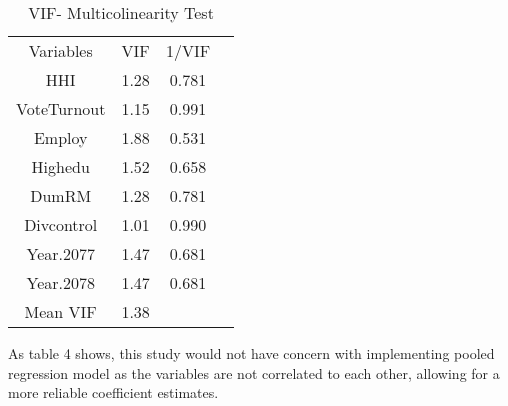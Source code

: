 \begin{table}[ht]
\centering
\begin{tabular}{cccc}

     Variables & VIF & 1/VIF \\ 
HHI & 1.28 &0.781    \\ 
VoteTurnout & 1.15& 0.991  \\ 
Employ & 1.88 & 0.531\\
Highedu & 1.52 & 0.658  \\ 
DumRM &1.28 & 0.781 \\ 
Divcontrol &1.01 & 0.990 \\ 
Year.2077 & 1.47& 0.681 \\
Year.2078 & 1.47 & 0.681\\
Mean VIF & 1.38 & \\
\end{tabular}
\caption{VIF- Multicolinearity Test}
\label{VIF- Multicolinearity Test}
\end{table}
As table 4 shows, this study would not have concern with implementing pooled regression model as the variables are not correlated to each other, allowing for a more reliable coefficient estimates.
\
